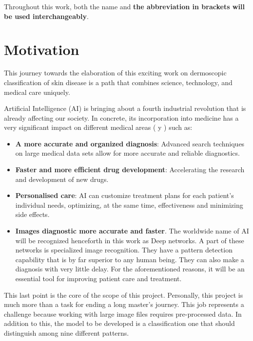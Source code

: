 Throughout this work, both the name and \textbf{the abbreviation in brackets will be used interchangeably}.

\section{Motivation}

This journey towards the elaboration of this exciting work on dermoscopic classification of skin disease is a path that combines science, technology, and medical care uniquely. 

Artificial Intelligence (AI) is bringing about a fourth industrial revolution that is already affecting our society. In concrete, its incorporation into medicine has a very significant impact on different medical areas (\cite{luciaclemares_que_2023} y \cite{apd_aplicaciones_IA_Medicina}) such as:

\begin{itemize}
    \item \textbf{A more accurate and organized diagnosis}: Advanced search techniques on large medical data sets allow for more accurate and reliable diagnostics. 
    \item \textbf{Faster and more efficient drug development}: Accelerating the research and development of new drugs.
    \item \textbf{Personalised care}: AI can customize treatment plans for each patient's individual needs, optimizing, at the same time, effectiveness and minimizing side effects.
    \item \textbf{Images diagnostic more accurate and faster}. The worldwide name of AI will be recognized henceforth in this work as Deep networks. A part of these networks is specialized image recognition. They have a pattern detection capability that is by far superior to any human being. They can also make a diagnosis with very little delay. For the aforementioned reasons, it will be an essential tool for improving patient care and treatment. 
\end{itemize}

This last point is the core of the scope of this project. Personally, this project is much more than a task for ending a long master's journey. This job represents a challenge because working with large image files requires pre-processed data. In addition to this, the model to be developed is a classification one that should distinguish among nine different patterns.

